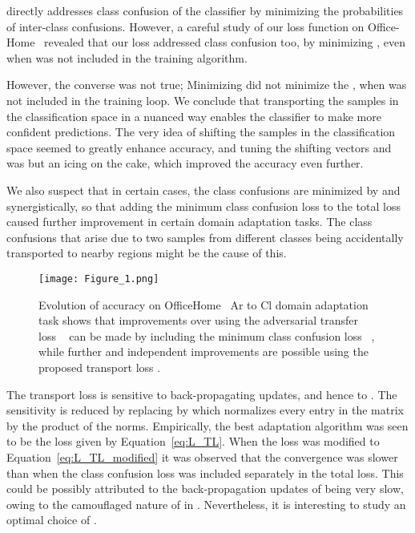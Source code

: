 \documentclass[10pt,twocolumn,letterpaper]{article}
\begin{document}
 directly addresses class confusion of the classifier by minimizing the probabilities of inter-class confusions. However, a careful study of our loss function on Office-Home~\cite{office-home} revealed that our loss addressed class confusion too, by minimizing , even when  was not included in the training algorithm.

However, the converse was not true; Minimizing  did not minimize the , when  was not included in the training loop. We conclude that transporting the samples in the classification space in a nuanced way enables the classifier to make more confident predictions. The very idea of shifting the samples in the classification space seemed to greatly enhance accuracy, and tuning the shifting vectors  and  was but an icing on the cake, which improved the accuracy even further. 

We also suspect that in certain cases, the class confusions are minimized by  and  synergistically, so that adding the minimum class confusion loss to the total loss caused further improvement in certain domain adaptation tasks. The class confusions that arise due to two samples from different classes being accidentally transported to nearby regions might be the cause of this. 

\begin{figure}
\begin{center}
   \texttt{[image: Figure\_1.png]}
\end{center}
   \caption{Evolution of accuracy on OfficeHome~\cite{office-home} Ar to Cl domain adaptation task shows that improvements over using the adversarial transfer loss  ~\cite{dann,cdan} can be made by including the minimum class confusion loss ~\cite{mcc}, while further and independent improvements are possible using the proposed transport loss .}
\label{fig:short}
\end{figure}

The transport loss  is sensitive to back-propagating updates, and hence to . The sensitivity is reduced by replacing  by  which normalizes every entry in the matrix  by the product of the norms. Empirically, the best adaptation algorithm was seen to be the loss given by Equation~\ref{eq:L_TL}. When the loss was modified to Equation~\ref{eq:L_TL_modified} it was observed that the convergence was slower than when the class confusion loss was included separately in the total loss. This could be possibly attributed to the back-propagation updates of  being very slow, owing to the camouflaged nature of  in . Nevertheless, it is interesting to study an optimal choice of .
\end{document}
